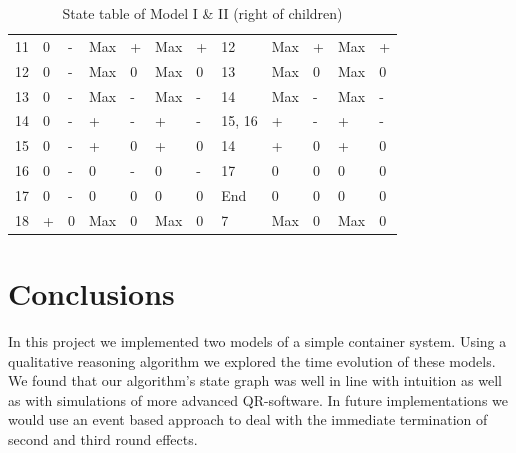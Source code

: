 \documentclass{article}
\begin{document}
\begin{table}
\begin{adjustbox}{center}
\begin{tabular}{@{}llllllllllll}
		11 & 0      & -           & Max    & +           & Max     & +            & 12       & Max    & +                                & Max      & +                                   \\
		12 & 0      & -           & Max    & 0           & Max     & 0            & 13       & Max    & 0                                & Max      & 0                                   \\
		13 & 0      & -           & Max    & -           & Max     & -            & 14       & Max    & -                                & Max      & -                                   \\
		14 & 0      & -           & +      & -           & +       & -            & 15, 16   & +      & -                                & +        & -                                   \\
		15 & 0      & -           & +      & 0           & +       & 0            & 14       & +      & 0                                & +        & 0                                   \\
		16 & 0      & -           & 0      & -           & 0       & -            & 17       & 0      & 0                                & 0        & 0                                   \\
		17 & 0      & -           & 0      & 0           & 0       & 0            & End      & 0      & 0                                & 0        & 0                                   \\
		18 & +      & 0           & Max    & 0           & Max     & 0            & 7        & Max    & 0                                & Max      & 0                                  
	\end{tabular}
	\end{adjustbox}
	\caption{State table of Model I \& II (right of children)}
	\label{table1}
\end{table}

\section{Conclusions}

In this project we implemented two models of a simple container system. Using a qualitative reasoning algorithm we explored the time evolution of these models. We found that our algorithm's state graph was well in line with intuition as well as with simulations of more advanced QR-software. In future implementations we would use an event based approach to deal with the immediate termination of second and third round effects. 
\end{document}
